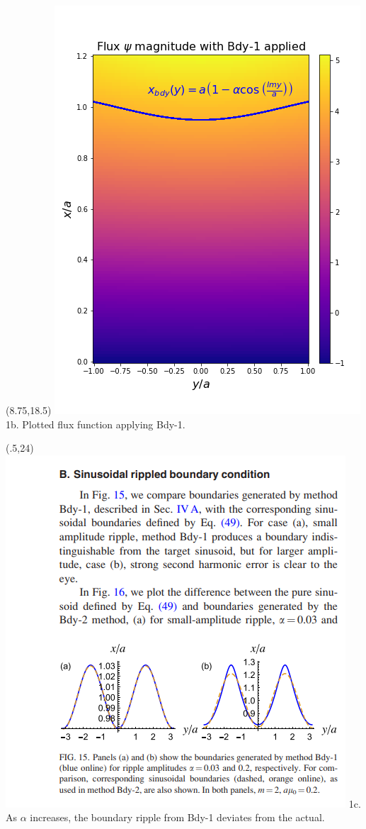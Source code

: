 \documentclass{beamer}
\begin{document}
\begin{frame}[t]
\begin{textblock}{15}(8.75,18.5)
    \includegraphics[scale=1.2]{bdy-1_general-solution.png} 
    \newline
    1b. Plotted flux function applying Bdy-1. \cite{dewar2017}
\end{textblock}

\begin{textblock}{15}(.5,24)
    \includegraphics[scale=1]{dewar-bdy1-error.png} 
    \newline
    1c. As $\alpha$ increases, the boundary ripple from Bdy-1 deviates from the actual. \cite{dewar2017}
\end{textblock}



\end{frame}
\end{document}
